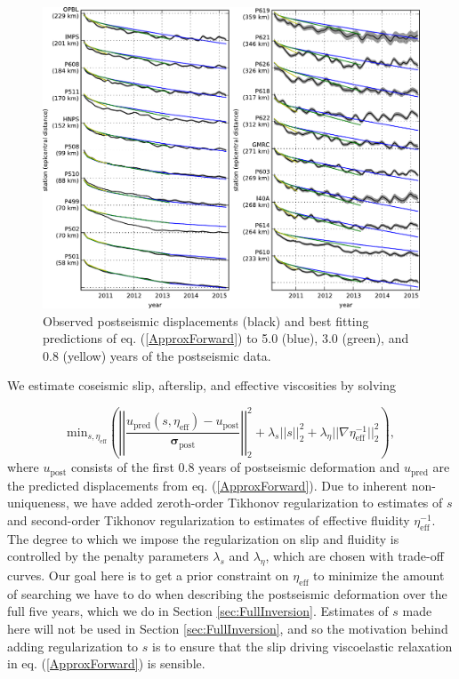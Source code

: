 \documentclass[draft,linenumbers]{AGUJournal}
\begin{document}
\begin{figure}
\includegraphics[scale=0.8]{Figures/RecordSectionDuration}
\centering 
\caption{Observed postseismic displacements (black) and best fitting predictions of eq. (\ref{ApproxForward}) to 5.0 (blue), 3.0 (green), and 0.8 (yellow) years of the postseismic data.} 
\label{fig:RecordSection1}
\end{figure}

We estimate coseismic slip, afterslip, and effective viscosities by solving 

\begin{equation}\label{ObjectiveFunction}
 \mathrm{min}_{s,\eta_\mathrm{eff}} \left(\left|\left|
 \frac{u_\mathrm{pred}(s,\eta_\mathrm{eff}) - u_\mathrm{post}}
 {\mathbf{\sigma_\mathrm{post}}}\right|\right|_2^2 + 
 \lambda_s||s||_2^2 + 
 \lambda_\eta||\nabla \eta_{\mathrm{eff}}^{-1}||_2^2\right),
\end{equation} 
where $u_\mathrm{post}$ consists of the first 0.8 years of postseismic deformation and $u_\mathrm{pred}$ are the predicted displacements from eq. (\ref{ApproxForward}).  Due to inherent non-uniqueness, we have added zeroth-order Tikhonov regularization to estimates of $s$ and second-order Tikhonov regularization to estimates of effective fluidity $\eta_\mathrm{eff}^{-1}$. The degree to which we impose the regularization on slip and fluidity is controlled by the penalty parameters $\lambda_s$ and $\lambda_\eta$, which are chosen with trade-off curves.  Our goal here is to get a prior constraint on $\eta_{\mathrm{eff}}$ to minimize the amount of searching we have to do when describing the postseismic deformation over the full five years, which we do in Section \ref{sec:FullInversion}.  Estimates of $s$ made here will not be used in Section \ref{sec:FullInversion}, and so the motivation behind adding regularization to $s$ is to ensure that the slip driving viscoelastic relaxation in eq. (\ref{ApproxForward}) is sensible.  
\end{document}
